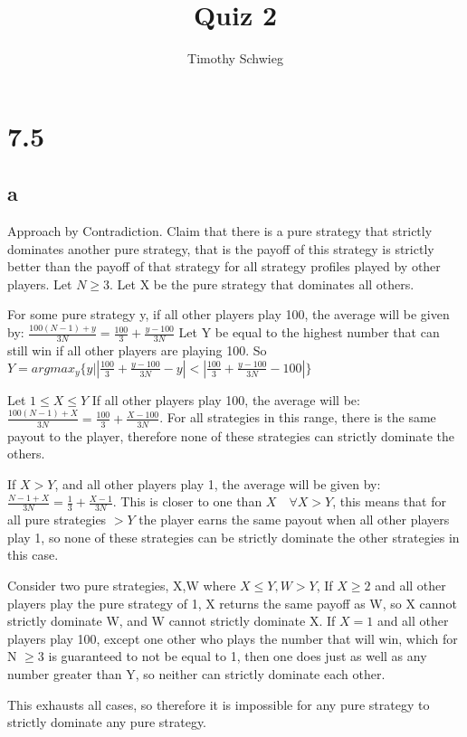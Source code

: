 \documentclass[10pt]{paper}
\title{Quiz 2}
\author{Timothy Schwieg}
\begin{document}
\maketitle

\section*{7.5}

\subsection*{a}

Approach by Contradiction. Claim that there is a pure strategy that
strictly dominates another pure strategy, that is the payoff of this
strategy is strictly better than the payoff of that strategy for all
strategy profiles played by other players. Let $N \geq 3$. Let X be the
pure strategy that dominates all others.

For some pure strategy y, if all other players play 100, the average
will be given by:
$\frac{100(N-1) + y}{3N} = \frac{100}{3} + \frac{y - 100}{3N}$ Let Y
be equal to the highest number that can still win if all other players
are playing 100. So
$Y = argmax_y \{ y | \left | \frac{100}{3} + \frac{y - 100}{3N} - y
\right | < \left | \frac{100}{3} + \frac{y-100}{3N} - 100 \right | \}$

Let $1 \leq X \leq Y$ If all other players play 100, the average will be:
$\frac{100(N-1) + X}{3N} = \frac{100}{3} + \frac{X - 100}{3N}$. For
all strategies in this range, there is the same payout to the player,
therefore none of these strategies can strictly dominate the others.

If $X > Y$, and all other players play 1, the average will be given
by: $\frac{N-1 + X}{3N} = \frac{1}{3} + \frac{X-1}{3N}$. This is
closer to one than $X \quad\forall X > Y$, this means that for all pure
strategies $> Y$ the player earns the same payout when all other
players play 1, so none of these strategies can be strictly dominate
the other strategies in this case.

Consider two pure strategies, X,W where $X \leq Y, W > Y$, If $X \geq 2$ and
all other players play the pure strategy of 1,  X
returns the same payoff as W, so X cannot strictly dominate W, and W
cannot strictly dominate X. If $X = 1$ and all other players play 100,
except one other who plays the number that will win, which for N $\geq 3$
is guaranteed to not be equal to 1, then one does just as well as any
number greater than Y, so neither can strictly dominate each other. 

This exhausts all cases, so therefore it is impossible for any pure strategy to
strictly dominate any pure strategy.
\end{document}
